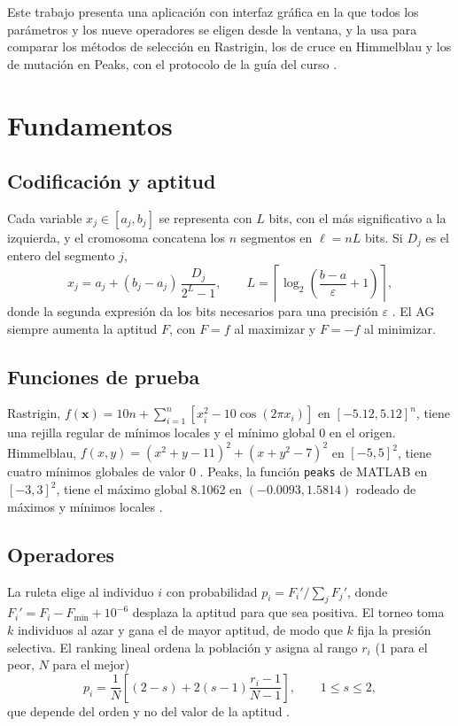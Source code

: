 \documentclass[conference]{IEEEtran}
\begin{document}
Este trabajo presenta una aplicación con interfaz gráfica en la que todos los parámetros y los nueve operadores se eligen desde la ventana, y la usa para comparar los métodos de selección en Rastrigin, los de cruce en Himmelblau y los de mutación en Peaks, con el protocolo de la guía del curso \cite{guia2026}.

\section{Fundamentos}

\subsection{Codificación y aptitud}

Cada variable $x_j\in[a_j,b_j]$ se representa con $L$ bits, con el más significativo a la izquierda, y el cromosoma concatena los $n$ segmentos en $\ell=nL$ bits. Si $D_j$ es el entero del segmento $j$,
\begin{equation}
x_j=a_j+(b_j-a_j)\,\frac{D_j}{2^L-1},\qquad L=\left\lceil\log_2\!\left(\frac{b-a}{\varepsilon}+1\right)\right\rceil,
\end{equation}
donde la segunda expresión da los bits necesarios para una precisión $\varepsilon$ \cite{michalewicz1996}. El AG siempre aumenta la aptitud $F$, con $F=f$ al maximizar y $F=-f$ al minimizar.

\subsection{Funciones de prueba}

Rastrigin, $f(\mathbf{x})=10n+\sum_{i=1}^{n}[x_i^2-10\cos(2\pi x_i)]$ en $[-5.12,5.12]^n$, tiene una rejilla regular de mínimos locales y el mínimo global 0 en el origen. Himmelblau, $f(x,y)=(x^2+y-11)^2+(x+y^2-7)^2$ en $[-5,5]^2$, tiene cuatro mínimos globales de valor 0 \cite{surjanovic}. Peaks, la función \texttt{peaks} de MATLAB en $[-3,3]^2$, tiene el máximo global 8.1062 en $(-0.0093, 1.5814)$ rodeado de máximos y mínimos locales \cite{peaks}.

\subsection{Operadores}

La ruleta elige al individuo $i$ con probabilidad $p_i=F_i'/\sum_j F_j'$, donde $F_i'=F_i-F_{\min}+10^{-6}$ desplaza la aptitud para que sea positiva. El torneo toma $k$ individuos al azar y gana el de mayor aptitud, de modo que $k$ fija la presión selectiva. El ranking lineal ordena la población y asigna al rango $r_i$ (1 para el peor, $N$ para el mejor)
\begin{equation}
p_i=\frac{1}{N}\left[(2-s)+2(s-1)\frac{r_i-1}{N-1}\right],\qquad 1\le s\le 2,
\end{equation}
que depende del orden y no del valor de la aptitud \cite{eiben2015}.
\end{document}
